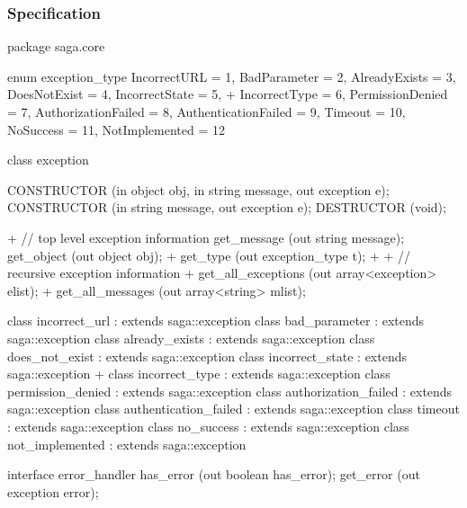  
 \newpage
 
 \subsubsection{Specification}
 
 \begin{myspec}
  package saga.core
  {
    enum exception_type
    {
      IncorrectURL         =  1,
      BadParameter         =  2,
      AlreadyExists        =  3,
      DoesNotExist         =  4,
      IncorrectState       =  5,
+     IncorrectType        =  6,
      PermissionDenied     =  7,
      AuthorizationFailed  =  8,
      AuthenticationFailed =  9,
      Timeout              = 10,
      NoSuccess            = 11,
      NotImplemented       = 12
    }

    class exception
    {
      CONSTRUCTOR          (in  object           obj,
                            in  string           message,
                            out exception        e);
      CONSTRUCTOR          (in  string           message,
                            out exception        e);
      DESTRUCTOR           (void);
 
+     // top level exception information
      get_message          (out string           message);
      get_object           (out object           obj);
+     get_type             (out exception_type   t);
+
+     // recursive exception information
+     get_all_exceptions   (out array<exception> elist);
+     get_all_messages     (out array<string>    mlist);
    }
 
    class incorrect_url         : extends saga::exception { }
    class bad_parameter         : extends saga::exception { }
    class already_exists        : extends saga::exception { }
    class does_not_exist        : extends saga::exception { }
    class incorrect_state       : extends saga::exception { }
+   class incorrect_type        : extends saga::exception { }
    class permission_denied     : extends saga::exception { }
    class authorization_failed  : extends saga::exception { }
    class authentication_failed : extends saga::exception { }
    class timeout               : extends saga::exception { }
    class no_success            : extends saga::exception { }
    class not_implemented       : extends saga::exception { }
 
 
    interface error_handler
    {
      has_error            (out boolean        has_error);
      get_error            (out exception      error);
    }
  }
 \end{myspec}
 

